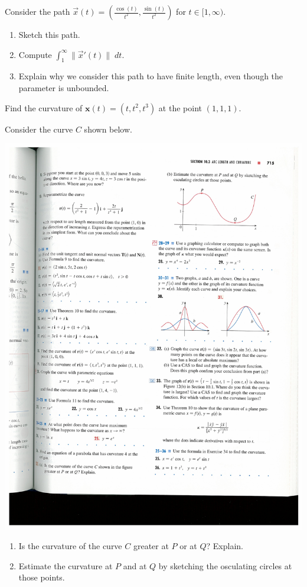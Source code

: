 \documentclass{ximera}
\begin{document}
\begin{problem}
Consider the path $\vec{x}(t) = \left(\frac{\cos(t)}{t^2},\frac{\sin(t)}{t^2}\right)$ for $t\in [1,\infty)$.
\begin{enumerate}
\item Sketch this path.
\item Compute $\int_1^\infty\|\vec{x}'(t)\|\;dt$.
\item Explain why we consider this path to have finite length, even though the parameter is unbounded.
\end{enumerate}
\end{problem}

\begin{problem}
Find the curvature of $\mathbf{x}(t)=(t,t^{2},t^{3})$ at the point $(1,1,1)$.
\end{problem}

\begin{problem}
Consider the curve $C$ shown below.
\begin{image}
\includegraphics[width = \textwidth]{curvyCurve}
\end{image}
\begin{enumerate}
\item Is the curvature of the curve $C$ greater at $P$ or at $Q$?  Explain.
\item Estimate the curvature at $P$ and at $Q$ by sketching the osculating circles at those points.
\end{enumerate}
\end{problem}
\end{document}
